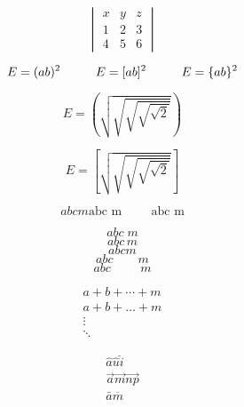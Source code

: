 \documentclass{article}
\begin{document}
\begin{equation}
  \begin{vmatrix}
    x & y & z \\
    1 & 2 & 3\\
    4 & 5 & 6
  \end{vmatrix}
\end{equation}

\begin{equation}
  E = (ab)^2 \hspace{1cm} E = [ab]^2 \hspace{1cm} E = \{ab\}^2\\
\end{equation}

\begin{equation}
  E = \left(\sqrt{\sqrt{\sqrt{\sqrt{\sqrt{2}}}}}\right)
\end{equation}

\begin{equation}
  E = \left[\sqrt{\sqrt{\sqrt{\sqrt{\sqrt{2}}}}}\right]
\end{equation}


\begin{equation*}
  abc   m \text{abc      m} \hspace{1cm} \mbox{abc m}  
\end{equation*}

\begin{equation*}
  abc \; m
\end{equation*}
\begin{equation*}
  abc \, m
\end{equation*}
\begin{equation*}
  abc \! m
\end{equation*}
\begin{equation*}
  abc \qquad m
\end{equation*}
\begin{equation*}
  abc \hspace{1cm} m
\end{equation*}



\begin{align*}
  a + b + \cdots + m\\
  a + b + \ldots + m\\
  \vdots \\
  \ddots
\end{align*}

\begin{align*}
  \hat{a} \hat{u} \hat{i} \\
  \vec{a} \vec{m} \vec{np} \\
  \bar{a} \overline{m}
\end{align*}
\end{document}
